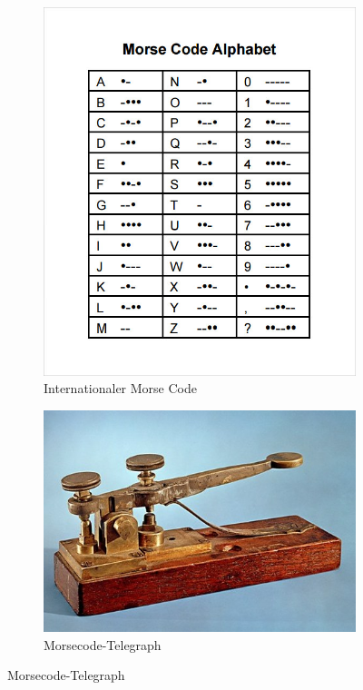\documentclass[a4paper,12pt]{article}
\begin{document}
	\begin{figure}[bh]
		\begin{subfigure}{0.5\linewidth}
			\centering
			\includegraphics[width=0.95\linewidth]{Bilder/Morse-Code-Alphabet-Chart.jpg}
			\caption{Internationaler Morse Code}
			\label{fig:morse-code}
		\end{subfigure}
		\begin{subfigure}{0.5\linewidth}
			\centering
			\includegraphics[width=0.95\linewidth]{Bilder/morse-telegraph-machine.jpg}
			\caption{Morsecode-Telegraph}
			\label{fig:morser}
		\end{subfigure}
	\end{figure}
\end{document}

